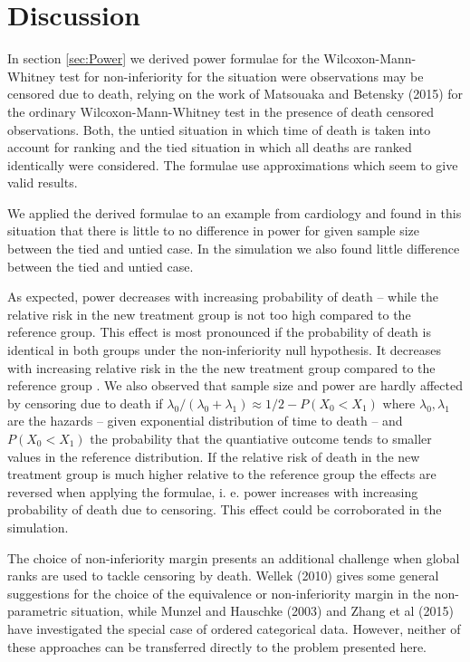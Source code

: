 \documentclass[bimj,fleqn]{w-art}
\theoremstyle{plain}
\theoremstyle{definition}
\begin{document}
\section{Discussion}
\label{sec:Discussion}
In section \ref{sec:Power} we derived power formulae for the Wilcoxon-Mann-Whitney
test for non-inferiority for the situation were observations may be censored due
to death, relying on the work of Matsouaka and Betensky (2015) for the ordinary
Wilcoxon-Mann-Whitney test in the presence of death censored observations. Both,
the untied situation in which time of death is taken into account for ranking and
the tied situation in which all deaths are ranked identically were considered.
The formulae use approximations which seem to give valid results.

We applied the derived formulae to an example from cardiology and found in this
situation that there is little to no difference in power for given sample size
between the tied and untied case. In the simulation we also found little
difference between the tied and untied case.

As expected, power decreases with increasing probability of death -- while the
relative risk in the new treatment group is not too high compared to the reference
group. This effect is most pronounced if the probability of death is identical in
both groups under the non-inferiority null hypothesis. It decreases with increasing
relative risk in the the new treatment group compared to the reference group . We
also observed that sample size and power are hardly affected by censoring due to
death if $\lambda_0/(\lambda_0 + \lambda_1) \approx 1/2 - P(X_0 < X_1)$ where
$\lambda_0, \lambda_1$ are the hazards -- given exponential distribution of time
to death -- and $P(X_0 < X_1)$ the probability that the quantiative outcome tends
to smaller values in the reference distribution. If the relative risk of death
in the new treatment group is much higher relative to the reference group the
effects are reversed when applying the formulae, i. e. power increases with
increasing probability of death due to censoring. This effect could be
corroborated in the simulation.

The choice of non-inferiority margin presents an additional challenge when global
ranks are used to tackle censoring by death. Wellek (2010) gives some general
suggestions for the choice of the equivalence or non-inferiority margin in the
non-parametric situation, while Munzel and Hauschke (2003) and Zhang et al (2015)
have investigated the special case of ordered categorical data. However, neither
of these approaches can be transferred directly to the problem presented here.
\end{document}
